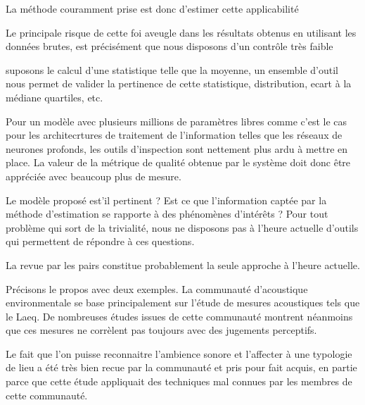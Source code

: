 La méthode couramment prise est donc d'estimer cette applicabilité

Le principale risque de cette foi aveugle dans les résultats obtenus en utilisant les données brutes, est précisément que nous disposons d'un contrôle très faible

suposons le calcul d'une statistique telle que la moyenne, un ensemble d'outil nous permet de valider la pertinence de cette statistique, distribution, ecart à la médiane quartiles, etc.

Pour un modèle avec plusieurs millions de paramètres libres comme c'est le cas pour les architecrtures de traitement de l'information telles que les réseaux de neurones profonds, les outils d'inspection sont nettement plus ardu à mettre en place. La valeur de la métrique de qualité obtenue par le système doit donc être appréciée avec beaucoup plus de mesure.

Le modèle proposé est'il pertinent ? Est ce que l'information captée par la méthode d'estimation se rapporte à des phénomènes d'intérêts ? Pour tout problème qui sort de la trivialité, nous ne disposons pas à l'heure actuelle d'outils qui permettent de répondre à ces questions.

La revue par les pairs constitue probablement la seule approche  à l'heure actuelle.

Précisons le propos avec deux exemples. La communauté d'acoustique environmentale se base principalement sur l'étude de mesures acoustiques tels que le Laeq. De nombreuses études issues de cette communauté montrent néanmoins que ces mesures ne corrèlent pas toujours avec des jugements perceptifs.

Le fait que l'on puisse reconnaitre l'ambience sonore et l'affecter à une typologie de lieu a été très bien recue par la communauté et pris pour fait acquis, en partie parce que cette étude appliquait des techniques mal connues par les membres de cette communauté.

